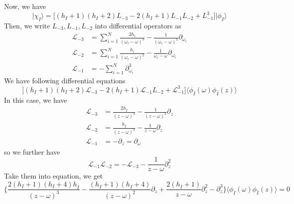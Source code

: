 Now, we have 
\[
\big| \chi_I \rangle = \Big\lbrack (h_I + 1)(h_I +2) L_{-3} - 2 (h_I +1) L_{-1}L_{-2} + L_{-1}^3 \Big\rbrack \big| \phi_I \rangle
\]
Then, we write $L_{-3}, L_{-1}, L_{-2}$ into differential operators as
\[
\begin{aligned}
\mathcal{L}_{-3} & = \sum_{i=1}^{N}\frac{2h_i}{(\omega_i - \omega)^3} - \frac{1}{(\omega_i - \omega)^2}\partial_{\omega_i} \\
\mathcal{L}_{-2} & = \sum_{i=1}^{N} \frac{h_i}{(\omega_i - \omega)^2} - \frac{1}{\omega_i -\omega} \partial_{\omega_i}\\
\mathcal{L}_{-1} &=-\sum_{i=1}^N\partial^3_{\omega_i}
\end{aligned}
\]
We have following differential equations
\[
\Big\lbrack (h_I + 1)(h_I +2) \mathcal{L}_{-3} - 2 (h_I +1) \mathcal{L}_{-1}L_{-2} + \mathcal{L}_{-1}^3 \Big\rbrack \langle \phi_I(\omega) \phi_{\bar{I}}(z) \rangle
\]
In this case, we have
\[
\begin{aligned}
\mathcal{L}_{-3} & = 
\frac{2h_{\bar{I}}}{(z - \omega)^3} - \frac{1}{(z - \omega)^2}\partial_{z} \\
\mathcal{L}_{-2} & = \frac{h_{\bar{I}}}{(z -\omega)^2} - \frac{1}{z -\omega} \partial_{z}\\
\mathcal{L}_{-1} &=-\partial_{z}= \partial_{\omega}
\end{aligned}
\]
so we further have 
\[
\mathcal{L}_{-1} \mathcal{L}_{-2} = - \mathcal{L}_{-3} - \frac{1}{z-\omega}\partial_{z}^2
\]
Take them into equation, we get
\[
\Big\lbrace\frac{2(h_I+1)(h_I +4)h_{\bar{I}}}{(z-\omega)^3} - \frac{(h_I +1)(h_I +4)}{(z-\omega)^2} \partial_{z} + \frac{2(h_I +1)}{z-\omega} \partial^2_{z} - \partial^3_z \Big\rbrace \langle \phi_I(\omega) \phi_{\bar{I}}(z) \rangle =0
\]
